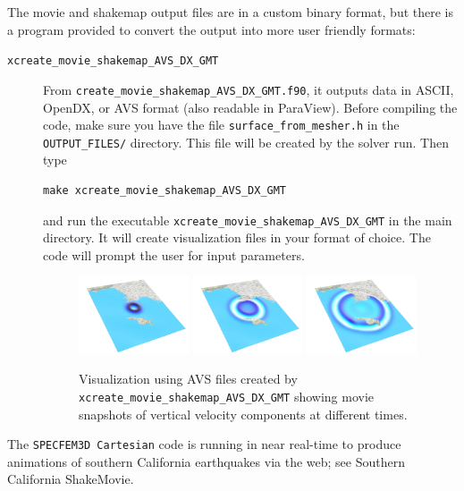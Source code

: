 The movie and shakemap output files are in a custom binary format, but there is
a program provided to convert the output into more user friendly formats:
\begin{description}
\item [{\texttt{xcreate\_movie\_shakemap\_AVS\_DX\_GMT}}]
From \texttt{create\_movie\_shakemap\_AVS\_DX\_GMT.f90},
it outputs data in ASCII, OpenDX, or AVS format (also readable in
ParaView). Before compiling the code, make sure you have the file
\texttt{surface\_from\_mesher.h} in the \texttt{OUTPUT\_FILES/} directory.
This file will be created by the solver run. Then type

{\footnotesize
\begin{verbatim}
make xcreate_movie_shakemap_AVS_DX_GMT
\end{verbatim}
}
and run the executable \texttt{xcreate\_movie\_shakemap\_AVS\_DX\_GMT}
in the main directory. It will create visualization files
in your format of choice. The code will prompt the user for input
parameters.


\begin{figure}[htbp]
\begin{centering}
\includegraphics[width=0.32\textwidth]{figures/movie_surf_1.jpg}
\includegraphics[width=0.32\textwidth]{figures/movie_surf_2.jpg}
\includegraphics[width=0.32\textwidth]{figures/movie_surf_3.jpg}
\par
\end{centering}
\caption{Visualization using AVS files created by \texttt{xcreate\_movie\_shakemap\_AVS\_DX\_GMT}
showing movie snapshots of vertical velocity components at different times.}
\label{fig:movie.surf}
\end{figure}

\end{description}
The \texttt{SPECFEM3D Cartesian} code is running in near real-time
to produce animations of southern California earthquakes via the web;
see Southern California ShakeMovie\textregistered{}.


